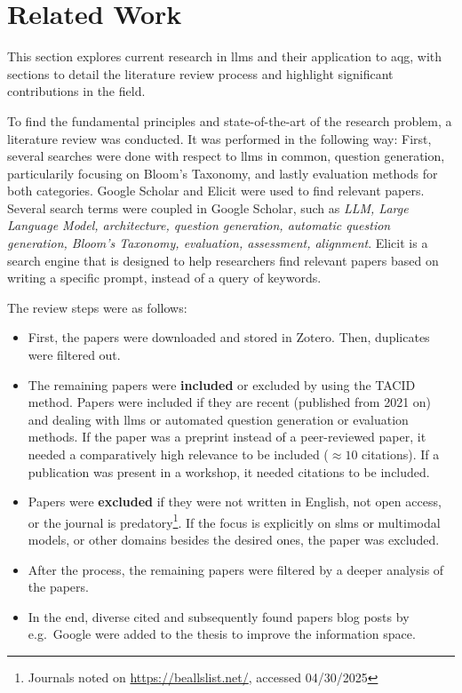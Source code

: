 \section{Related Work} \label{sec:related-work}

This section explores current research in \ac{llms} and their application to \ac{aqg}, with sections to detail the literature review process and highlight significant contributions in the field.


 To find the fundamental principles and state-of-the-art of the research problem, a literature review was conducted. It was performed in the following way: First, several searches were done with respect to \ac{llms} in common, question generation, particularily focusing on Bloom's Taxonomy, and lastly evaluation methods for both categories. Google Scholar and Elicit were used to find relevant papers. Several search terms were coupled in Google Scholar, such as \textit{LLM, Large Language Model, architecture, question generation, automatic question generation, Bloom's Taxonomy, evaluation, assessment, alignment}. Elicit is a search engine that is designed to help researchers find relevant papers based on writing a specific prompt, instead of a query of keywords.

 The review steps were as follows: 
\begin{itemize}
    \item First, the papers were downloaded and stored in Zotero. Then, duplicates were filtered out.
    \item The remaining papers were \textbf{included} or excluded by using the TACID method. Papers were included if they are recent (published from 2021 on) and dealing with \ac{llms} or automated question generation or evaluation methods. If the paper was a preprint instead of a peer-reviewed paper, it needed a comparatively high relevance to be included ($\approx 10$ citations). If a publication was present in a workshop, it needed citations to be included.
    \item Papers were \textbf{excluded} if they were not written in English, not open access, or the journal is predatory\footnote{Journals noted on \url{https://beallslist.net/}, accessed 04/30/2025}. If the focus is explicitly on \ac{slms} or multimodal models, or other domains besides the desired ones, the paper was excluded. 
    \item After the process, the remaining papers were filtered by a deeper analysis of the papers.
    \item In the end, diverse cited and subsequently found papers blog posts by e.g.\ Google were added to the thesis to improve the information space.
\end{itemize}

